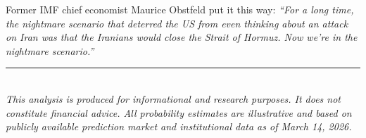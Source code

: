 \documentclass[12pt,a4paper]{article}
\begin{document}
Former IMF chief economist Maurice Obstfeld put it this way: \textit{``For a long time, the nightmare scenario that deterred the US from even thinking about an attack on Iran was that the Iranians would close the Strait of Hormuz. Now we're in the nightmare scenario.''}

\vspace{1em}


\vspace{2em}
\noindent\rule{\textwidth}{0.3pt}\\[0.3em]
{\small\color{subtext}
\textit{This analysis is produced for informational and research purposes. It does not constitute financial advice. All probability estimates are illustrative and based on publicly available prediction market and institutional data as of March 14, 2026.}
}
\end{document}
